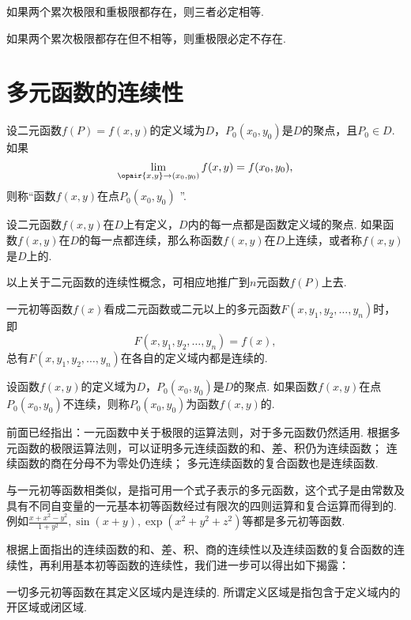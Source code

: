 \begin{corollary}
如果两个累次极限和重极限都存在，则三者必定相等.
\end{corollary}

\begin{corollary}
如果两个累次极限都存在但不相等，则重极限必定不存在.
\end{corollary}

\section{多元函数的连续性}
\begin{definition}
设二元函数\(f(P)=f(x,y)\)的定义域为\(D\)，\(P_0(x_0,y_0)\)是\(D\)的聚点，且\(P_0 \in D\).如果\[
\lim\limits_{\opair{x,y}\to(x_0,y_0)} f(x,y) = f(x_0,y_0),
\]则称“函数\(f(x,y)\)在点\(P_0(x_0,y_0)\) ”.

设二元函数\(f(x,y)\)在\(D\)上有定义，\(D\)内的每一点都是函数定义域的聚点.
如果函数\(f(x,y)\)在\(D\)的每一点都连续，那么称函数\(f(x,y)\)在\(D\)上连续，或者称\(f(x,y)\)是\(D\)上的.
\end{definition}
以上关于二元函数的连续性概念，可相应地推广到\(n\)元函数\(f(P)\)上去.

一元初等函数\(f(x)\)看成二元函数或二元以上的多元函数\(F(x,y_1,y_2,\dotsc,y_n)\)时，即\[
F(x,y_1,y_2,\dotsc,y_n) = f(x),
\]总有\(F(x,y_1,y_2,\dotsc,y_n)\)在各自的定义域内都是连续的.

\begin{definition}
设函数\(f(x,y)\)的定义域为\(D\)，\(P_0(x_0,y_0)\)是\(D\)的聚点.
如果函数\(f(x,y)\)在点\(P_0(x_0,y_0)\)不连续，则称\(P_0(x_0,y_0)\)为函数\(f(x,y)\)的.
\end{definition}

前面已经指出：一元函数中关于极限的运算法则，对于多元函数仍然适用.
根据多元函数的极限运算法则，可以证明多元连续函数的和、差、积仍为连续函数；
连续函数的商在分母不为零处仍连续；
多元连续函数的复合函数也是连续函数.

与一元初等函数相类似，是指可用一个式子表示的多元函数，这个式子是由常数及具有不同自变量的一元基本初等函数经过有限次的四则运算和复合运算而得到的.
例如\(\frac{x+x^2-y^2}{1+y^2},\sin(x+y),\exp(x^2+y^2+z^2)\)等都是多元初等函数.

根据上面指出的连续函数的和、差、积、商的连续性以及连续函数的复合函数的连续性，再利用基本初等函数的连续性，我们进一步可以得出如下揭露：

一切多元初等函数在其定义区域内是连续的.
所谓定义区域是指包含于定义域内的开区域或闭区域.

